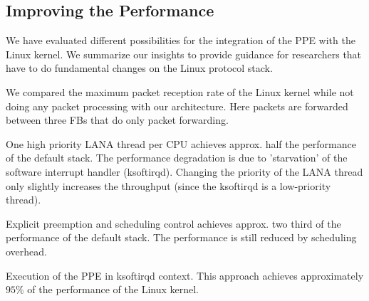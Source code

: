 \documentclass{sig-alternate}
\begin{document}
\subsection{Improving the Performance}
We have evaluated different possibilities for the integration of the PPE with the 
Linux kernel. We summarize our insights to provide guidance for researchers that have to do fundamental changes on the Linux protocol stack.

We compared the maximum packet reception rate of the Linux kernel while not doing any packet processing with our architecture. Here packets are forwarded between three FBs that do only packet forwarding. 


\begin{compactitem}
\item One high priority LANA thread per CPU achieves approx. half the performance of the default stack. The performance degradation is due to 'starvation' of the software interrupt handler (ksoftirqd). Changing the priority of the LANA thread only slightly increases the throughput (since the ksoftirqd is a low-priority thread).
\item Explicit preemption and scheduling control achieves approx. two third of the performance of the default stack. The performance is still reduced by scheduling overhead. 
\item Execution of the PPE in ksoftirqd context. This approach achieves
      approximately $95\%$ of the performance of the Linux kernel.
\end{compactitem}
\end{document}
